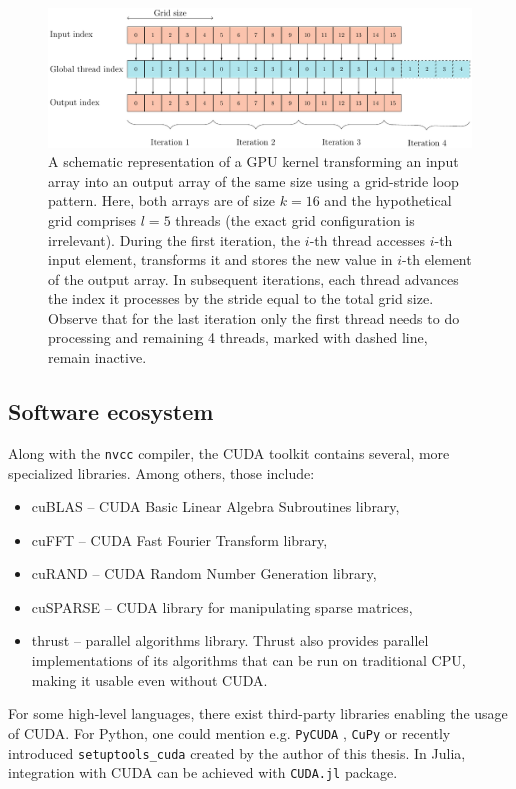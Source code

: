 \begin{example}
  \begin{figure}
    \includegraphics[width=\textwidth]{figures/gpu_scheduling}
    \caption{A schematic representation of a GPU kernel transforming an input array into an
      output array of the same size using a grid-stride loop pattern. Here, both
      arrays are of size $k=16$ and the hypothetical grid comprises $l=5$ threads
      (the exact grid configuration is irrelevant). During the first iteration, the
      $i$-th thread accesses $i$-th input element, transforms it and stores the new
      value in $i$-th element of the output array. In subsequent iterations, each
      thread advances the index it processes by the stride equal to the total grid
      size. Observe that for the last iteration only the first thread needs to do
      processing and remaining 4 threads, marked with dashed line, remain inactive. }
    \label{fig:strided-loop}
  \end{figure}

\end{example}

\subsection{Software ecosystem}
Along with the \texttt{nvcc} compiler, the CUDA toolkit contains several, more
specialized libraries. Among others, those include:
\begin{itemize}
  \item cuBLAS \cite{cublas} -- CUDA Basic Linear Algebra Subroutines library,
  \item cuFFT \cite{cufft} -- CUDA Fast Fourier Transform library,
  \item cuRAND \cite{curand} -- CUDA Random Number Generation library,
  \item cuSPARSE \cite{cusparse} -- CUDA library for manipulating sparse matrices,
  \item thrust \cite{thrust} -- parallel algorithms library. Thrust also provides
    parallel implementations of its algorithms that can be run on traditional CPU,
    making it usable even without CUDA.
\end{itemize}
For some high-level languages, there exist third-party libraries enabling the
usage of CUDA. For Python, one could mention e.g. \texttt{PyCUDA}
\cite{pycuda}, \texttt{CuPy} \cite{cupy} or recently introduced
\texttt{setuptools\_cuda} \cite{setuptoolscuda} created by the author of this
thesis. In Julia, integration with CUDA can be achieved with \texttt{CUDA.jl}
\cite{CUDAjl} package.

